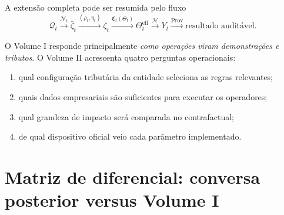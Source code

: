 \documentclass[11pt,a4paper]{article}
\newcommand{\cH}{\mathcal{H}}
\newcommand{\cQ}{\mathcal{Q}}
\newcommand{\cN}{\mathcal{N}}
\newcommand{\Prov}{\operatorname{Prov}}
\begin{document}
A extensão completa pode ser resumida pelo fluxo
\begin{equation}
\boxed{
\cQ_t
\xrightarrow{\cN_t}
\bar\zeta_t
\xrightarrow{(\rho_t,\eta_t)}
\zeta_t
\xrightarrow{\mathfrak E_t(\Theta_t)}
\Theta_t^{\mathrm{eff}}
\xrightarrow{\cH}
Y_t
\xrightarrow{\Prov}
\text{resultado auditável}.
}
\end{equation}

O Volume I responde principalmente \emph{como operações viram demonstrações e tributos}. O Volume II acrescenta quatro perguntas operacionais:
\begin{enumerate}
  \item qual configuração tributária da entidade seleciona as regras relevantes;
  \item quais dados empresariais são suficientes para executar os operadores;
  \item qual grandeza de impacto será comparada no contrafactual;
  \item de qual dispositivo oficial veio cada parâmetro implementado.
\end{enumerate}

\appendix
\section{Matriz de diferencial: conversa posterior versus Volume I}
\end{document}
